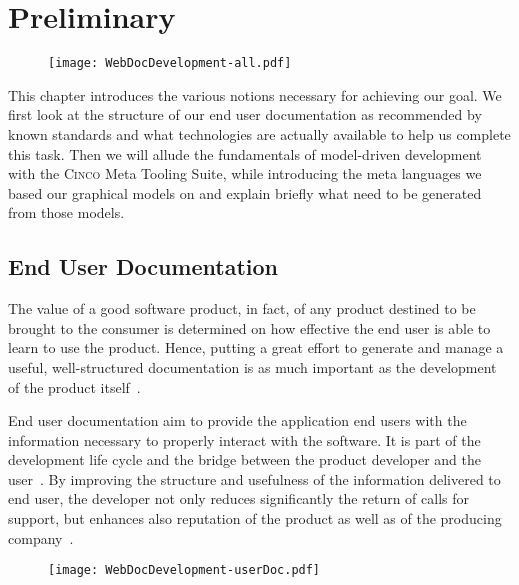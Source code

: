 
\chapter{Preliminary}\label{ch:Basis}

\begin{figure}[h]
    \centering
    \texttt{[image: WebDocDevelopment-all.pdf]}
    \label{fig:procWorkflow}
\end{figure}

This chapter introduces the various notions necessary for achieving our goal. We first look at the structure of our end user documentation as recommended by known standards and what technologies are actually available to help us complete this task. Then we will allude the fundamentals of model-driven development with the \textsc{Cinco} Meta Tooling Suite, while introducing the meta languages we based our graphical models on and explain briefly what need to be generated from those models.

\pagebreak

\section{End User Documentation}\label{sec:endUserDoc}

The value of a good software product, in fact, of any product destined to be brought to the consumer is determined on how effective the end user is able to learn to use the product. Hence, putting a great effort to generate and manage a useful, well-structured documentation is as much important as the development of the product itself~\cite{ISO-IEC-IEEE}. 

End user documentation aim to provide the application end users with the information necessary to properly interact with the software. It is part of the development life cycle and the bridge between the product developer and the user~\cite{9238529}. By improving the structure and usefulness of the information delivered to end user, the developer not only reduces significantly the return of calls for support, but enhances also reputation of the product as well as of the producing company~\cite{ieee5712775}.

\begin{figure}[h]
    \centering
    \texttt{[image: WebDocDevelopment-userDoc.pdf]}
    \label{fig:userDoc}
\end{figure}

